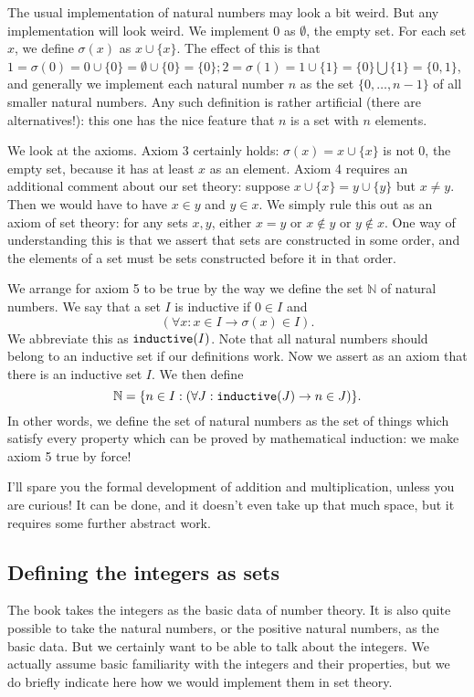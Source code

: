 \documentclass[12pt]{article}
\begin{document}
The usual implementation of natural numbers may look a bit weird.  But any implementation will look weird.  We implement 0
as $\emptyset$, the empty set.  For each set $x$, we define $\sigma(x)$ as $x \cup \{x\}$.  The effect of this is that
$1 = \sigma(0) = 0 \cup \{0\} = \emptyset \cup \{0\} = \{0\};  2 = \sigma(1) = 1 \cup \{1\} = \{0\} \bigcup \{1\} = \{0,1\}$, and generally we implement each natural number $n$ as the set $\{0,\ldots,n-1\}$ of all smaller natural numbers.  Any such definition is rather artificial (there are alternatives!):  this one has the nice feature that $n$ is a set with $n$ elements.

We look at the axioms.  Axiom 3 certainly holds:  $\sigma(x) = x \cup \{x\}$ is not 0, the empty set, because it has at least $x$ as an element.  Axiom 4 requires an additional comment about our set theory:  suppose $x \cup \{x\} = y \cup \{y\}$ but $x \neq y$.  Then we would have to have $x \in y$ and $y \in x$.  We simply rule this out as an axiom of set theory:  for any sets $x,y$,
either $x =y$ or $x \not\in y$ or $y \not\in x$.  One way of understanding this is that we assert that sets are constructed in some order, and the elements of a set must be sets constructed before it in that order.

We arrange for axiom 5 to be true by the way we define the set $\mathbb N$ of natural numbers.  We say that a set
$I$ is inductive if $0 \in I$ and $$(\forall x:x \in I \rightarrow \sigma(x) \in I).$$ We abbreviate this as ${\tt inductive}(I)$.  Note that all natural numbers should belong to an inductive set if our definitions work.  Now we assert as an axiom that there is an inductive set $I$.  We then define $$\mathbb N= \{n \in I:(\forall J:{\tt inductive}(J) \rightarrow n \in J)\}.$$  In other words,
we define the set of natural numbers as the set of things which satisfy every property which can be proved by mathematical induction:  we make axiom 5 true by force!

I'll spare you the formal development of addition and multiplication, unless you are curious!  It can be done, and it doesn't even take up that much space, but it requires some further abstract work.

\subsection{Defining the integers as sets}

The book takes the integers as the basic data of number theory.  It is also quite possible to take the natural numbers, or the positive natural numbers, as the basic data.  But we certainly want to be able to talk about the integers.  We actually assume basic familiarity with the integers and their properties, but we do briefly indicate here how we would implement them in set theory.
\end{document}
